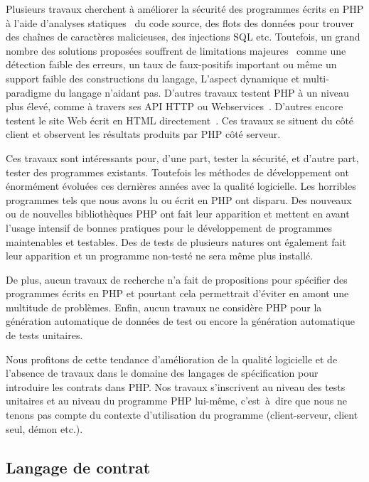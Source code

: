 Plusieurs travaux cherchent à améliorer la sécurité des programmes écrits en PHP
à l'aide d'analyses statiques~ du code source, des flots des données pour trouver des
chaînes de caractères malicieuses, des injections SQL etc. Toutefois, un grand
nombre des solutions proposées souffrent de limitations
majeures~ comme une détection faible des erreurs, un taux de
faux-positifs important ou même un support faible des constructions du langage,
L'aspect dynamique et multi-paradigme du langage n'aidant pas. D'autres travaux
testent PHP à un niveau plus élevé, comme à travers ses API HTTP ou
Webservices~\acite{}. D'autres encore testent le site Web écrit en HTML
directement~. Ces
travaux se situent du côté client et observent les résultats produits par PHP
côté serveur.

Ces travaux sont intéressants pour, d'une part, tester la sécurité, et d'autre
part, tester des programmes existants. Toutefois les méthodes de développement
ont énormément évoluées ces dernières années avec la qualité logicielle. Les
horribles programmes tels que nous avons lu ou écrit en PHP ont disparu. Des
nouveaux  ou de nouvelles bibliothèques PHP ont fait leur
apparition et mettent en avant l'usage intensif de bonnes pratiques pour le
développement de programmes maintenables et testables. Des
 de tests de plusieurs natures ont également fait leur
apparition et un programme non-testé ne sera même plus installé. 

De plus, aucun travaux de recherche n'a fait de propositions pour spécifier des
programmes écrits en PHP et pourtant cela permettrait d'éviter en amont une
multitude de problèmes. Enfin, aucun travaux ne considère PHP pour la génération
automatique de données de test ou encore la génération automatique de tests
unitaires.

Nous profitons de cette tendance d'amélioration de la qualité logicielle et de
l'absence de travaux dans le domaine des langages de spécification pour
introduire les contrats dans PHP. Nos travaux s'inscrivent au niveau des tests
unitaires et au niveau du programme PHP lui-même, c'est~à~dire que nous ne
tenons pas compte du contexte d'utilisation du programme (client-serveur, client
seul, démon etc.).

\subsection{Langage de contrat}


